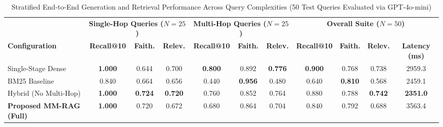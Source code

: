 \documentclass[conference]{IEEEtran}
\begin{document}
\begin{table}[t]
\centering
\caption{Stratified End-to-End Generation and Retrieval Performance Across Query Complexities (50 Test Queries Evaluated via GPT-4o-mini)}
\label{tab:e2e_results}
\begin{tabular}{@{}lcccccccccc@{}}
\toprule
 & \multicolumn{3}{c}{\textbf{Single-Hop Queries ($N=25$)}} & \multicolumn{3}{c}{\textbf{Multi-Hop Queries ($N=25$)}} & \multicolumn{4}{c}{\textbf{Overall Suite ($N=50$)}} \\
\cmidrule(lr){2-4} \cmidrule(lr){5-7} \cmidrule(lr){8-11}
\textbf{Configuration} & \textbf{Recall@10} & \textbf{Faith.} & \textbf{Relev.} & \textbf{Recall@10} & \textbf{Faith.} & \textbf{Relev.} & \textbf{Recall@10} & \textbf{Faith.} & \textbf{Relev.} & \textbf{Latency (ms)} \\ \midrule
Single-Stage Dense & \textbf{1.000} & 0.644 & 0.700 & \textbf{0.800} & 0.892 & \textbf{0.776} & \textbf{0.900} & 0.768 & 0.738 & 2959.3 \\
BM25 Baseline & 0.840 & 0.664 & 0.656 & 0.440 & \textbf{0.956} & 0.480 & 0.640 & \textbf{0.810} & 0.568 & 2459.1 \\
Hybrid (No Multi-Hop) & \textbf{1.000} & \textbf{0.724} & \textbf{0.720} & 0.760 & 0.852 & 0.764 & 0.880 & 0.788 & \textbf{0.742} & \textbf{2351.0} \\
\textbf{Proposed MM-RAG (Full)} & \textbf{1.000} & 0.720 & 0.672 & 0.680 & 0.864 & 0.704 & 0.840 & 0.792 & 0.688 & 3563.4 \\ \bottomrule
\end{tabular}
\end{table}
\end{document}
